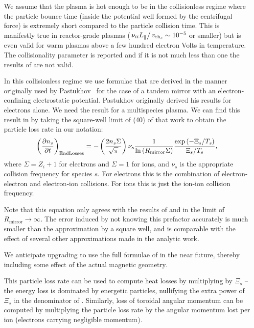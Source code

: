 \documentclass{revtex4}
\begin{document}
We assume that the plasma is hot enough to be in the collisionless regime where the particle bounce time (inside the potential well formed by the centrifugal force) is extremely short compared to the particle collision time. This is manifestly true in reactor-grade plasmas ($\left.\nu_{ii} L_\parallel \right/ v_{\mathrm{th}_s} \sim 10^{-5}$ or smaller) but is even valid for warm plasmas above a few hundred electron Volts in temperature. The collisionality parameter is reported and if it is not much less than one the results of \mctrans{} are not valid.

In this collisionless regime we use formulae that are derived in the manner originally used by Pastukhov~\cite{Pastukhov1974} for the case of a tandem mirror with an electron-confining electrostatic potential. Pastukhov originally derived his results for electrons alone. We need the result for a multispecies plasma.  
We can find this result in \citet{CattoBernsteinMirror1} by taking the square-well limit of (40) of that work to obtain the particle loss rate in our notation:
\begin{equation}
\left( \frac{\partial n_s} {\partial t} \right)_{\mathrm{End Losses}} = 
	- \left( \frac{2 n_s \Sigma}{\sqrt{\pi}} \right) \nu_s \frac{1}{\ln\left( R_{\mathrm{mirror}} \Sigma\right)} \frac{\exp\left( -\Xi_s/T_s \right)}{\Xi_s/T_s},
	\label{ParticleLossRate}
\end{equation}
where $\Sigma = Z_i + 1$ for electrons and $\Sigma = 1$ for ions, and $\nu_s$ is the appropriate collision frequency for species $s$. For electrons this is the combination of electron-electron and electron-ion collisions. For ions this is just the ion-ion collision frequency.

Note that this equation only agrees with the results of \citet{Pastukhov1974} and \citet{cohen1978collisional} in the limit of $R_{\mathrm{mirror}} \rightarrow \infty$. The error induced by not knowing this prefactor accurately is much smaller than the approximation by a square well, and is comparable with the effect of several other approximations made in the analytic work.

We anticipate upgrading \mctrans{} to use the full formulae of \citet{CattoBernsteinMirror1} in the near future, thereby including some effect of the actual magnetic geometry.

This particle loss rate can be used to compute heat losses by multiplying by $\Xi_s$ -- the energy loss is dominated by energetic particles, nullifying the extra power of $\Xi_s$ in the denominator of . Similarly, loss of toroidal angular momentum can be computed by multiplying the particle loss rate by the angular momentum lost per ion (electrons carrying negligible momentum).
\end{document}
